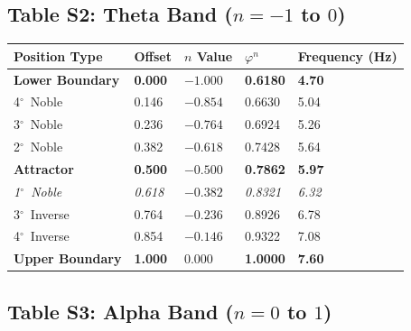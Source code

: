 \documentclass[11pt,a4paper]{article}
\newcommand{\degree}{$^\circ$}  %
\newcommand{\phisym}{\varphi}
\begin{document}
\subsection*{Table S2: Theta Band ($n = -1$ to $0$)}

\begin{table}[H]
\centering
\begin{tabular}{@{}lllll@{}}
\toprule
Position Type & Offset & $n$ Value & $\phisym^n$ & Frequency (Hz) \\
\midrule
\textbf{Lower Boundary} & \textbf{0.000} & $\mathbf{-1.000}$ & \textbf{0.6180} & \textbf{4.70} \\
4\degree\ Noble & 0.146 & $-0.854$ & 0.6630 & 5.04 \\
3\degree\ Noble & 0.236 & $-0.764$ & 0.6924 & 5.26 \\
2\degree\ Noble & 0.382 & $-0.618$ & 0.7428 & 5.64 \\
\textbf{Attractor} & \textbf{0.500} & $\mathbf{-0.500}$ & \textbf{0.7862} & \textbf{5.97} \\
\textit{1\degree\ Noble} & \textit{0.618} & $-0.382$ & \textit{0.8321} & \textit{6.32} \\
3\degree\ Inverse & 0.764 & $-0.236$ & 0.8926 & 6.78 \\
4\degree\ Inverse & 0.854 & $-0.146$ & 0.9322 & 7.08 \\
\textbf{Upper Boundary} & \textbf{1.000} & $\mathbf{0.000}$ & \textbf{1.0000} & \textbf{7.60} \\
\bottomrule
\end{tabular}
\end{table}

\subsection*{Table S3: Alpha Band ($n = 0$ to $1$)}
\end{document}
